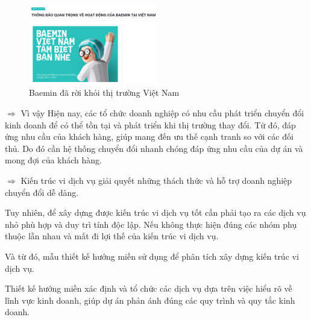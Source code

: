 \begin{figure}[H]

\centering

\includegraphics[width = 0.5\textwidth]{pictures/Baemin/main.png}

\caption{Baemin đã rời khỏi thị trường Việt Nam}

\end{figure}

$\Rightarrow$  Vì vậy Hiện nay, các tổ chức doanh nghiệp có nhu cầu phát triển chuyển đổi kinh doanh để có thể tồn tại và phát triển khi thị trường thay đổi. Từ đó, đáp ứng nhu cầu của khách hàng, giúp mang đến ưu thế cạnh tranh so với các đối thủ. Do đó cần hệ thống chuyển đổi nhanh chóng đáp ứng nhu cầu của dự án và mong đợi của khách hàng.

$\Rightarrow$  Kiến trúc vi dịch vụ giải quyết những thách thức và hỗ trợ doanh nghiệp chuyển đổi dễ dàng.


Tuy nhiên, để xây dựng được kiến trúc vi dịch vụ tốt cần phải tạo ra các dịch vụ nhỏ phù hợp và duy trì tính độc lập. Nếu không thực hiện đúng các nhóm phụ thuộc lẫn nhau và mất đi lợi thế của kiến trúc vi dịch vụ.

Và từ đó, mẫu thiết kế hướng miền sử dụng để phân tích xây dựng kiến trúc vi dịch vụ.

Thiết kế hướng miền xác định và tổ chức các dịch vụ dựa trên việc hiểu rõ về lĩnh vực kinh doanh, giúp dự án phản ánh đúng các quy trình và quy tắc kinh doanh.





